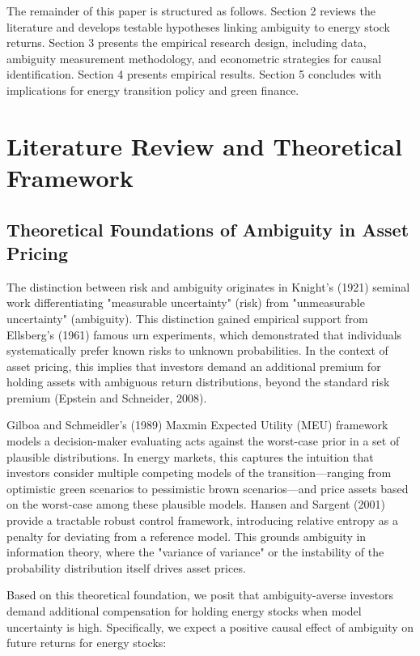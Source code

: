 \documentclass[preprint,12pt,authoryear]{elsarticle}
\begin{document}
The remainder of this paper is structured as follows. Section 2 reviews the literature and develops testable hypotheses linking ambiguity to energy stock returns. Section 3 presents the empirical research design, including data, ambiguity measurement methodology, and econometric strategies for causal identification. Section 4 presents empirical results. Section 5 concludes with implications for energy transition policy and green finance.

\section{Literature Review and Theoretical Framework}

\subsection{Theoretical Foundations of Ambiguity in Asset Pricing}

The distinction between risk and ambiguity originates in Knight's (1921) seminal work differentiating "measurable uncertainty" (risk) from "unmeasurable uncertainty" (ambiguity). This distinction gained empirical support from Ellsberg's (1961) famous urn experiments, which demonstrated that individuals systematically prefer known risks to unknown probabilities. In the context of asset pricing, this implies that investors demand an additional premium for holding assets with ambiguous return distributions, beyond the standard risk premium (Epstein and Schneider, 2008).

Gilboa and Schmeidler's (1989) Maxmin Expected Utility (MEU) framework models a decision-maker evaluating acts against the worst-case prior in a set of plausible distributions. In energy markets, this captures the intuition that investors consider multiple competing models of the transition—ranging from optimistic green scenarios to pessimistic brown scenarios—and price assets based on the worst-case among these plausible models. Hansen and Sargent (2001) provide a tractable robust control framework, introducing relative entropy as a penalty for deviating from a reference model. This grounds ambiguity in information theory, where the "variance of variance" or the instability of the probability distribution itself drives asset prices.

Based on this theoretical foundation, we posit that ambiguity-averse investors demand additional compensation for holding energy stocks when model uncertainty is high. Specifically, we expect a positive causal effect of ambiguity on future returns for energy stocks:
\end{document}

